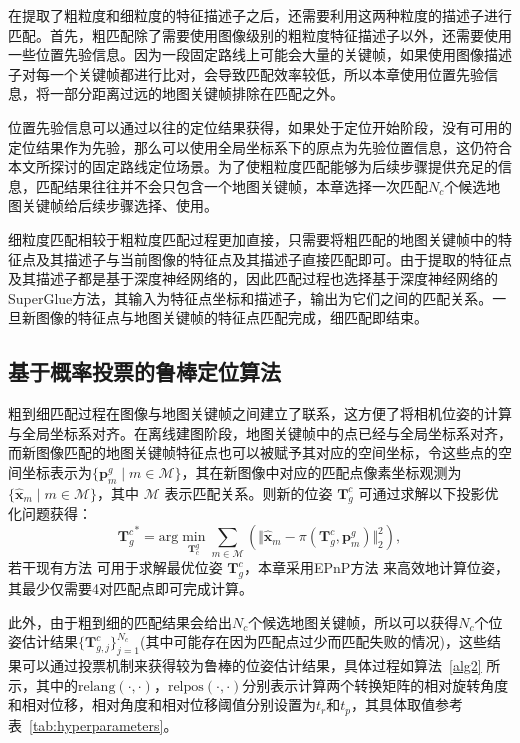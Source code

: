 在提取了粗粒度和细粒度的特征描述子之后，还需要利用这两种粒度的描述子进行匹配。首先，粗匹配除了需要使用图像级别的粗粒度特征描述子以外，还需要使用一些位置先验信息。因为一段固定路线上可能会大量的关键帧，如果使用图像描述子对每一个关键帧都进行比对，会导致匹配效率较低，所以本章使用位置先验信息，将一部分距离过远的地图关键帧排除在匹配之外。

位置先验信息可以通过以往的定位结果获得，如果处于定位开始阶段，没有可用的定位结果作为先验，那么可以使用全局坐标系下的原点为先验位置信息，这仍符合本文所探讨的固定路线定位场景。为了使粗粒度匹配能够为后续步骤提供充足的信息，匹配结果往往并不会只包含一个地图关键帧，本章选择一次匹配$N_c$个候选地图关键帧给后续步骤选择、使用。

细粒度匹配相较于粗粒度匹配过程更加直接，只需要将粗匹配的地图关键帧中的特征点及其描述子与当前图像的特征点及其描述子直接匹配即可。由于提取的特征点及其描述子都是基于深度神经网络的，因此匹配过程也选择基于深度神经网络的SuperGlue\cite{sarlin2020superglue}方法，其输入为特征点坐标和描述子，输出为它们之间的匹配关系。一旦新图像的特征点与地图关键帧的特征点匹配完成，细匹配即结束。

\subsection{基于概率投票的鲁棒定位算法}
\label{sec:loc_vote}

粗到细匹配过程在图像与地图关键帧之间建立了联系，这方便了将相机位姿的计算与全局坐标系对齐。在离线建图阶段，地图关键帧中的点已经与全局坐标系对齐，而新图像匹配的地图关键帧特征点也可以被赋予其对应的空间坐标，令这些点的空间坐标表示为$\{\symbf{p}_m^g \mid m \in \mathcal{M}\}$，其在新图像中对应的匹配点像素坐标观测为$\{\hat{\symbf{x}}_m \mid m \in \mathcal{M}\}$，其中 $\mathcal{M}$ 表示匹配关系。则新的位姿 $\symbf{T}^{c}_g$ 可通过求解以下投影优化问题获得：
\begin{equation}
  {\symbf{T}^{c}_g}^* = \text{arg} \min_{\symbf{T}_{c}^g} \sum_{m \in \mathcal{M}} \left( \Vert \hat{\symbf{x}}_m - \pi(\symbf{T}^{c}_g, \symbf{p}_m^g) \Vert^2_2 \right),
\end{equation}
若干现有方法 \cite{lepetit2009ep, gao2003complete} 可用于求解最优位姿 $\symbf{T}^{c}_g$，本章采用EPnP方法 \cite{lepetit2009ep}来高效地计算位姿，其最少仅需要4对匹配点即可完成计算。

此外，由于粗到细的匹配结果会给出$N_c$个候选地图关键帧，所以可以获得$N_c$个位姿估计结果$\{ \symbf{T}^{c}_{g,j} \}^{N_c}_{j=1}$(其中可能存在因为匹配点过少而匹配失败的情况)，这些结果可以通过投票机制来获得较为鲁棒的位姿估计结果，具体过程如算法~\ref{alg2} 所示，其中的$\text{relang}(\cdot, \cdot)$，$\text{relpos}(\cdot, \cdot)$分别表示计算两个转换矩阵的相对旋转角度和相对位移，相对角度和相对位移阈值分别设置为$t_r$和$t_p$，其具体取值参考表~\ref{tab:hyperparameters}。

